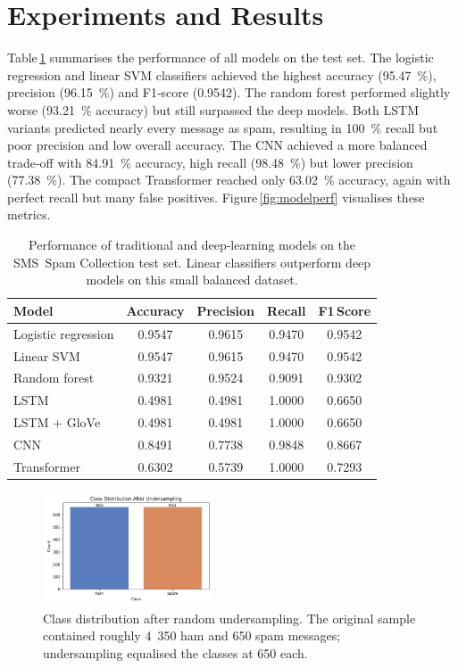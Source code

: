 \documentclass[conference]{IEEEtran}
\begin{document}
\section{Experiments and Results}

Table\,\ref{tab:results} summarises the performance of all models on the test set.  The logistic regression and linear SVM classifiers achieved the highest accuracy (95.47 \%), precision (96.15 \%) and F1‑score (0.9542).  The random forest performed slightly worse (93.21 \% accuracy) but still surpassed the deep models.  Both LSTM variants predicted nearly every message as spam, resulting in 100 \% recall but poor precision and low overall accuracy.  The CNN achieved a more balanced trade‑off with 84.91 \% accuracy, high recall (98.48 \%) but lower precision (77.38 \%).  The compact Transformer reached only 63.02 \% accuracy, again with perfect recall but many false positives.  Figure\,\ref{fig:modelperf} visualises these metrics.

\begin{table}[t]
  \centering
  \caption{Performance of traditional and deep‑learning models on the SMS Spam Collection test set.  Linear classifiers outperform deep models on this small balanced dataset.}
  \label{tab:results}
  \begin{tabular}{lcccc}
    \toprule
    Model & Accuracy & Precision & Recall & F1\,Score \\
    \midrule
    Logistic regression & 0.9547 & 0.9615 & 0.9470 & 0.9542 \\
    Linear SVM & 0.9547 & 0.9615 & 0.9470 & 0.9542 \\
    Random forest & 0.9321 & 0.9524 & 0.9091 & 0.9302 \\
    LSTM & 0.4981 & 0.4981 & 1.0000 & 0.6650 \\
    LSTM + GloVe & 0.4981 & 0.4981 & 1.0000 & 0.6650 \\
    CNN & 0.8491 & 0.7738 & 0.9848 & 0.8667 \\
    Transformer & 0.6302 & 0.5739 & 1.0000 & 0.7293 \\
    \bottomrule
  \end{tabular}
\end{table}

\begin{figure}[t]
  \centering
  \includegraphics[width=0.45\textwidth]{fig_balanced.png}
  \caption{Class distribution after random undersampling.  The original sample contained roughly 4 350 ham and 650 spam messages; undersampling equalised the classes at 650 each.}
  \label{fig:balanced}
\end{figure}
\end{document}
